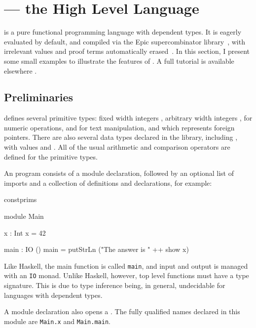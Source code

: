 \section{\Idris{} --- the High Level Language}

\label{sect:hll}

\Idris{} is
a pure functional programming language with dependent types. It is
eagerly evaluated by default, and compiled via the Epic supercombinator
library~\cite{brady2011epic}, with irrelevant values and proof terms
automatically erased~\cite{Brady2003,Brady2005}.
In this section, I present some small examples to illustrate
the features of \Idris{}.
A full tutorial is available elsewhere \cite{idristutorial}. 

\subsection{Preliminaries}

\Idris{} defines several primitive types: fixed width integers
, arbitrary width integers ,
 for numeric operations,  and  for
text manipulation, and  which represents foreign pointers.
There are also several data types declared in the library, including
, with values  and . All of the usual
arithmetic and comparison operators are defined for the primitive types.

An \Idris{} program consists of a module declaration, followed by an optional
list of imports and a collection of definitions and declarations, for example:

\begin{SaveVerbatim}{constprims}

module Main

x : Int
x = 42

main : IO ()
main = putStrLn ("The answer is " ++ show x)

\end{SaveVerbatim}

\noindent
Like Haskell, the main function is called \texttt{main}, and input and output
is managed with an \texttt{IO} monad. Unlike Haskell, however,  top
level functions must have a type signature. This is due to type inference
being, in general, undecidable for languages with dependent types.

A module declaration also opens a . The fully qualified names
declared in this module are \texttt{Main.x} and \texttt{Main.main}.

